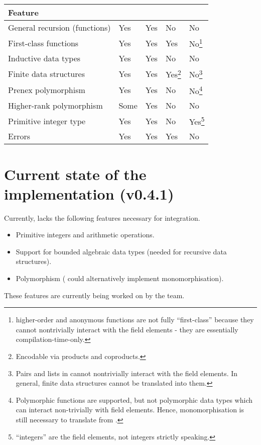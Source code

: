\documentclass[final]{msc}
\begin{document}
\vspace*{2mm}
\begin{minipage}[b]{\hsize}\centering

\begin{tabular}{lllll}
\hline
\textbf{Feature} & \textbf{\Juvix{}} & \textbf{\JuvixCore{}} & \textbf{\Geb{}} & \textbf{\VampIR{}} \\ \hline
General recursion (functions)   &  Yes   &  Yes   &  No  &   No  \\
First-class functions   &  Yes   &  Yes   &  Yes  &   No\footnote{\VampIR{} higher-order and anonymous functions are not fully ``first-class'' because they cannot nontrivially interact with the field elements - they are essentially compilation-time-only.}  \\
Inductive data types  &  Yes   &  Yes   &  No  &   No  \\
Finite data structures  &  Yes   &  Yes   &  Yes\footnote{Encodable via products and coproducts.} & No\footnote{Pairs and lists in \VampIR{} cannot nontrivially interact with the field elements. In general, finite \JuvixCore{} data structures cannot be translated into them.}  \\
Prenex polymorphism  &  Yes   &  Yes   &  No  &  No\footnote{Polymorphic functions are supported, but not polymorphic data types which can interact non-trivially with field elements. Hence, monomorphisation is still necessary to translate from \JuvixCore{}.} \\
Higher-rank polymorphism  &  Some   &  Yes   &  No  &   No  \\
Primitive integer type  &  Yes   &  Yes   &  No  &   Yes\footnote{\VampIR{} ``integers'' are the field elements, not integers strictly speaking.} \\
Errors &  Yes   &  Yes   &  Yes  &   No \\
\hline
\end{tabular}
\end{minipage}

\section{Current state of the \Geb{} implementation (v0.4.1) }\label{sec_geb}

Currently, \Geb{} lacks the following features necessary for \Juvix{}
integration.
\begin{itemize}
\item Primitive integers and arithmetic operations.
\item Support for bounded algebraic data types (needed for recursive data structures).
\item Polymorphism (\Juvix{} could alternatively implement monomorphisation).
\end{itemize}
These features are currently being worked on by the \Geb{} team.
\end{document}
